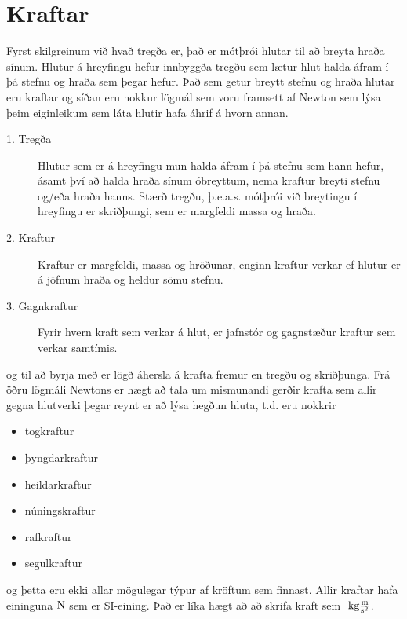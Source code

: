 \chapter{Kraftar}
Fyrst skilgreinum við hvað tregða er, það er mótþrói hlutar til að breyta
hraða sínum. Hlutur á hreyfingu hefur innbyggða tregðu sem lætur hlut halda
áfram í þá stefnu og hraða sem þegar hefur. Það sem getur breytt stefnu og hraða
hlutar eru kraftar og síðan eru nokkur lögmál sem voru framsett af Newton
sem lýsa þeim eiginleikum sem láta hlutir hafa áhrif á hvorn annan.
\begin{formaltext}
	\begin{description}
		\item[1. Tregða] Hlutur sem er á hreyfingu mun halda áfram í þá stefnu sem
			hann hefur, ásamt því að halda hraða sínum óbreyttum, nema kraftur
			breyti stefnu og/eða hraða hanns. Stærð tregðu, þ.e.a.s. mótþrói við
			breytingu í hreyfingu er skriðþungi, sem er margfeldi massa og hraða.
		\item[2. Kraftur] Kraftur er margfeldi, massa og hröðunar, enginn kraftur
			verkar ef hlutur er á jöfnum hraða og heldur sömu stefnu.
		\item[3. Gagnkraftur] Fyrir hvern kraft sem verkar á hlut, er jafnstór
			og gagnstæður kraftur sem verkar samtímis.
	\end{description}
\end{formaltext}
og til að byrja með er lögð áhersla á krafta fremur en tregðu og skriðþunga.
Frá öðru lögmáli Newtons er hægt að tala um mismunandi gerðir krafta sem allir
gegna hlutverki þegar reynt er að lýsa hegðun hluta, t.d. eru nokkrir
\begin{itemize}
	\item togkraftur
	\item þyngdarkraftur
	\item heildarkraftur
	\item núningskraftur
	\item rafkraftur
	\item segulkraftur
\end{itemize}
og þetta eru ekki allar mögulegar týpur af kröftum sem finnast. Allir kraftar
hafa eininguna $\textrm{N}$ sem er SI-eining. Það er líka hægt að að skrifa kraft
sem $\textrm{ k}\textrm{g} \frac{\textrm{m}}{\textrm{s}^2}$.